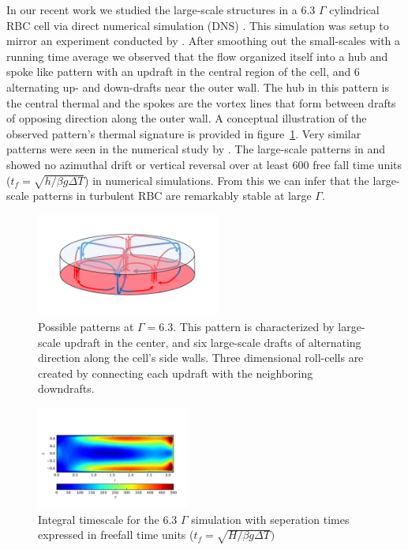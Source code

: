 \documentclass[twocolumn,10pt]{tsfp}
\begin{document}
In our recent work we studied the large-scale structures in a 6.3 $\Gamma$ cylindrical RBC cell via direct numerical simulation (DNS) \citep{sakievich2016large}.  This simulation was setup to mirror an experiment conducted by \cite{fernandes2001spatial}. After smoothing out the small-scales with a running time average we observed that the flow organized itself into a hub and spoke like pattern with an updraft in the central region of the cell, and 6 alternating up- and down-drafts near the outer wall.  The hub in this pattern is the central thermal and the spokes are the vortex lines that form between drafts of opposing direction along the outer wall.  A conceptual illustration of the observed pattern's thermal signature is provided in figure~\ref{fig:63ar}. Very similar patterns were seen in the numerical study by \cite{bailon2010aspect}. The large-scale patterns in \cite{sakievich2016large} and \cite{bailon2010aspect} showed no azimuthal drift or vertical reversal over at least 600 free fall time units ($t_f=\sqrt{h/\beta g \Delta T}$) in numerical simulations. From this we can infer that the large-scale patterns in turbulent RBC are remarkably stable at large $\Gamma$.

\begin{figure}
\centering
\includegraphics[page=1,trim=4.1cm 3cm 4.1cm 3cm, clip, width=6cm]{Ar63Sym}

\caption{Possible patterns at $\Gamma=6.3$.  This pattern is characterized by large-scale updraft in the center, and six large-scale drafts of alternating direction along the cell's side walls. Three dimensional roll-cells are created by connecting each updraft with the neighboring downdrafts. }
\label{fig:63ar}
\end{figure}

\begin{figure}
\begin{center}
\includegraphics[trim=0cm 1.0cm 0.7cm 2.7cm,clip,width=0.45\textwidth]{IntegralTS_TE}
\caption{Integral timescale for the 6.3 $\Gamma$ simulation with seperation times expressed in freefall time units ($t_f=\sqrt{H/\beta g \Delta T})$}
\label{default}
\end{center}
\end{figure}
\end{document}

